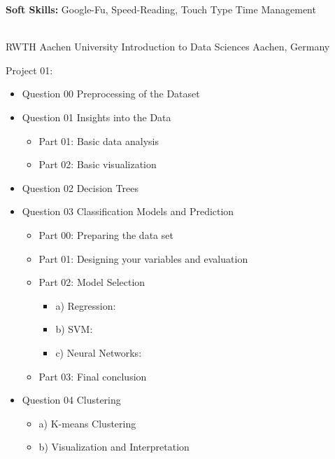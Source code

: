 \begin{cventries}
{\begin{cvitems}
        \item {\textbf{Soft Skills:} Google-Fu, Speed-Reading, Touch Type Time Management}
      \end{cvitems}
    }\\
  \cventry
    {RWTH Aachen University} %
    {Introduction to Data Sciences} %
    {Aachen, Germany} %
    {} %
    {
      \begin{cvitems} %
        \item {Project 01:
        \begin{itemize}
        \item Question 00 Preprocessing of the Dataset 
        \item Question 01 Insights into the Data
        \begin{itemize}
            \item Part 01: Basic data analysis
            \item Part 02: Basic visualization
        \end{itemize}
        \item Question 02 Decision Trees
        \item Question 03 Classification Models and Prediction
        \begin{itemize}
            \item Part 00: Preparing the data set
            \item Part 01: Designing your variables and evaluation
            \item Part 02: Model Selection
            \begin{itemize}
                \item a) Regression:
                \item b) SVM:
                \item c) Neural Networks:
            \end{itemize}
        \item Part 03: Final conclusion
        \end{itemize}
        \item Question 04 Clustering
        \begin{itemize}
            \item a) K-means Clustering
            \item b) Visualization and Interpretation
        \end{itemize}
        \end{itemize}}

\end{cvitems}}
\end{cventries}
